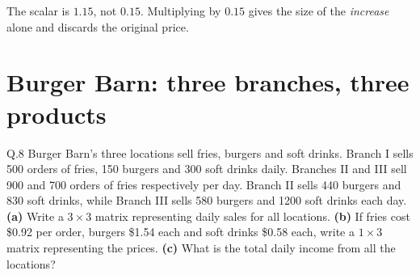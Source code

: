 \begin{pitfall}
The scalar is $1.15$, not $0.15$. Multiplying by $0.15$ gives the size of the
\emph{increase} alone and discards the original price.
\end{pitfall}

\section{Burger Barn: three branches, three products}

\begin{question}{Q.8}
Burger Barn's three locations sell fries, burgers and soft drinks. Branch I
sells 500 orders of fries, 150 burgers and 300 soft drinks daily. Branches II
and III sell 900 and 700 orders of fries respectively per day. Branch II sells
440 burgers and 830 soft drinks, while Branch III sells 580 burgers and 1200
soft drinks each day.
\textbf{(a)} Write a $3\times3$ matrix representing daily sales for all
locations.
\textbf{(b)} If fries cost \$0.92 per order, burgers \$1.54 each and soft
drinks \$0.58 each, write a $1\times3$ matrix representing the prices.
\textbf{(c)} What is the total daily income from all the locations?
\end{question}

